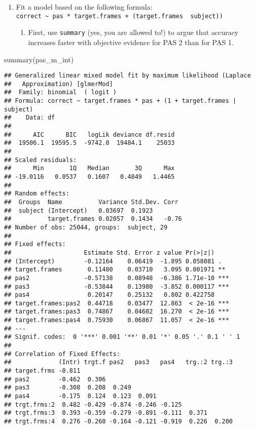 \documentclass[
]{article}
\newenvironment{Shaded}{\begin{snugshade}}{\end{snugshade}}
\newcommand{\FunctionTok}[1]{\textcolor[rgb]{0.00,0.00,0.00}{#1}}
\newcommand{\NormalTok}[1]{#1}
\providecommand{\tightlist}{%
  \setlength{\itemsep}{0pt}\setlength{\parskip}{0pt}}
\begin{document}
\begin{enumerate}
\def\labelenumi{\arabic{enumi})}
\item
  Fit a model based on the following formula:
  \texttt{correct\ \textasciitilde{}\ pas\ *\ target.frames\ +\ (target.frames\ \textbar{}\ subject))}

  \begin{enumerate}
  \def\labelenumii{\roman{enumii}.}
  \tightlist
  \item
    First, use \texttt{summary} (yes, you are allowed to!) to argue that
    accuracy increases faster with objective evidence for PAS 2 than for
    PAS 1.
  \end{enumerate}
\end{enumerate}

\begin{Shaded}
\begin{Highlighting}[]
\FunctionTok{summary}\NormalTok{(pas\_m\_int)}
\end{Highlighting}
\end{Shaded}

\begin{verbatim}
## Generalized linear mixed model fit by maximum likelihood (Laplace
##   Approximation) [glmerMod]
##  Family: binomial  ( logit )
## Formula: correct ~ target.frames * pas + (1 + target.frames | subject)
##    Data: df
## 
##      AIC      BIC   logLik deviance df.resid 
##  19506.1  19595.5  -9742.0  19484.1    25033 
## 
## Scaled residuals: 
##      Min       1Q   Median       3Q      Max 
## -19.0116   0.0537   0.1607   0.4849   1.4465 
## 
## Random effects:
##  Groups  Name          Variance Std.Dev. Corr 
##  subject (Intercept)   0.03697  0.1923        
##          target.frames 0.02057  0.1434   -0.76
## Number of obs: 25044, groups:  subject, 29
## 
## Fixed effects:
##                    Estimate Std. Error z value Pr(>|z|)    
## (Intercept)        -0.12164    0.06419  -1.895 0.058081 .  
## target.frames       0.11480    0.03710   3.095 0.001971 ** 
## pas2               -0.57138    0.08948  -6.386 1.71e-10 ***
## pas3               -0.53844    0.13980  -3.852 0.000117 ***
## pas4                0.20147    0.25132   0.802 0.422758    
## target.frames:pas2  0.44718    0.03477  12.863  < 2e-16 ***
## target.frames:pas3  0.74867    0.04602  16.270  < 2e-16 ***
## target.frames:pas4  0.75930    0.06867  11.057  < 2e-16 ***
## ---
## Signif. codes:  0 '***' 0.001 '**' 0.01 '*' 0.05 '.' 0.1 ' ' 1
## 
## Correlation of Fixed Effects:
##             (Intr) trgt.f pas2   pas3   pas4   trg.:2 trg.:3
## target.frms -0.811                                          
## pas2        -0.462  0.306                                   
## pas3        -0.308  0.208  0.249                            
## pas4        -0.175  0.124  0.123  0.091                     
## trgt.frms:2  0.482 -0.429 -0.874 -0.246 -0.125              
## trgt.frms:3  0.393 -0.359 -0.279 -0.891 -0.111  0.371       
## trgt.frms:4  0.276 -0.260 -0.164 -0.121 -0.919  0.226  0.200
\end{verbatim}
\end{document}
